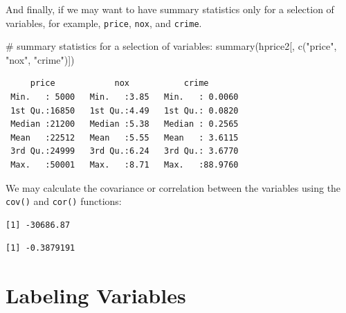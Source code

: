 \documentclass[
  letterpaper,
  DIV=11,
  numbers=noendperiod]{scrreprt}
\newenvironment{Shaded}{\begin{snugshade}}{\end{snugshade}}
\newcommand{\CommentTok}[1]{\textcolor[rgb]{0.37,0.37,0.37}{#1}}
\newcommand{\FunctionTok}[1]{\textcolor[rgb]{0.28,0.35,0.67}{#1}}
\newcommand{\NormalTok}[1]{\textcolor[rgb]{0.00,0.23,0.31}{#1}}
\newcommand{\SpecialCharTok}[1]{\textcolor[rgb]{0.37,0.37,0.37}{#1}}
\newcommand{\StringTok}[1]{\textcolor[rgb]{0.13,0.47,0.30}{#1}}
\begin{document}
And finally, if we may want to have summary statistics only for a
selection of variables, for example, \texttt{price}, \texttt{nox}, and
\texttt{crime}.

\begin{Shaded}
\begin{Highlighting}[]
\CommentTok{\# summary statistics for a selection of variables:}
\FunctionTok{summary}\NormalTok{(hprice2[, }\FunctionTok{c}\NormalTok{(}\StringTok{"price"}\NormalTok{, }\StringTok{"nox"}\NormalTok{, }\StringTok{"crime"}\NormalTok{)])}
\end{Highlighting}
\end{Shaded}

\begin{verbatim}
     price            nox           crime        
 Min.   : 5000   Min.   :3.85   Min.   : 0.0060  
 1st Qu.:16850   1st Qu.:4.49   1st Qu.: 0.0820  
 Median :21200   Median :5.38   Median : 0.2565  
 Mean   :22512   Mean   :5.55   Mean   : 3.6115  
 3rd Qu.:24999   3rd Qu.:6.24   3rd Qu.: 3.6770  
 Max.   :50001   Max.   :8.71   Max.   :88.9760  
\end{verbatim}

We may calculate the covariance or correlation between the variables
using the \texttt{cov()} and \texttt{cor()} functions:

\begin{Shaded}
\end{Shaded}

\begin{verbatim}
[1] -30686.87
\end{verbatim}

\begin{Shaded}
\end{Shaded}

\begin{verbatim}
[1] -0.3879191
\end{verbatim}

\chapter{Labeling Variables}\label{labeling-variables}
\end{document}

